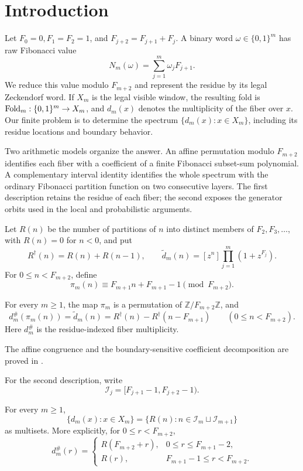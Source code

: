 \section{Introduction}\label{sec:introduction}

Let \(F_0=0,F_1=F_2=1\), and \(F_{j+2}=F_{j+1}+F_j\).  A binary word
\(\omega\in\{0,1\}^m\) has raw Fibonacci value
\[
 N_m(\omega)=\sum_{j=1}^m\omega_jF_{j+1}.
\]
We reduce this value modulo \(F_{m+2}\) and represent the residue by its legal
Zeckendorf word.  If \(X_m\) is the legal visible window, the resulting fold
is \(\mathrm{Fold}_m:\{0,1\}^m\to X_m\), and \(d_m(x)\) denotes the multiplicity of
the fiber over \(x\).  Our finite problem is to determine the spectrum
\(\{d_m(x):x\in X_m\}\), including its residue locations and boundary
behavior.

Two arithmetic models organize the answer.  An affine permutation modulo
\(F_{m+2}\) identifies each fiber with a coefficient of a finite Fibonacci
subset-sum polynomial.  A complementary interval identity identifies the
whole spectrum with the ordinary Fibonacci partition function on two
consecutive layers.  The first description retains the residue of each
fiber; the second exposes the generator orbits used in the local and
probabilistic arguments.

Let \(R(n)\) be the number of partitions of \(n\) into distinct members of
\(F_2,F_3,\ldots\), with \(R(n)=0\) for \(n<0\), and put
\[
 R^\dagger(n)=R(n)+R(n-1),
 \qquad
 \widetilde d_m(n)=[z^n]\prod_{j=1}^m(1+z^{F_j}).
\]
For \(0\le n<F_{m+2}\), define
\[
 \pi_m(n)\equiv F_{m+1}n+F_{m+1}-1\pmod{F_{m+2}}.
\]

\begin{theoremA}
For every \(m\ge1\), the map \(\pi_m\) is a permutation of
\(\mathbb Z/F_{m+2}\mathbb Z\), and
\[
 d_m^\#(\pi_m(n))
 =\widetilde d_m(n)
 =R^\dagger(n)-R^\dagger(n-F_{m+1})
 \qquad(0\le n<F_{m+2}).
\]
Here \(d_m^\#\) is the residue-indexed fiber multiplicity.
\end{theoremA}

The affine congruence and the boundary-sensitive coefficient decomposition
are proved in
.

For the second description, write
\[
 \mathcal I_j=[F_{j+1}-1,F_{j+2}-1).
\]

\begin{theoremB}
For every \(m\ge1\),
\[
 \{d_m(x):x\in X_m\}
 =\{R(n):n\in\mathcal I_m\sqcup\mathcal I_{m+1}\}
\]
as multisets.  More explicitly, for \(0\le r<F_{m+2}\),
\[
 d_m^\#(r)=
 \begin{cases}
 R(F_{m+2}+r),&0\le r\le F_{m+1}-2,\\
 R(r),&F_{m+1}-1\le r<F_{m+2}.
 \end{cases}
\]
\end{theoremB}

